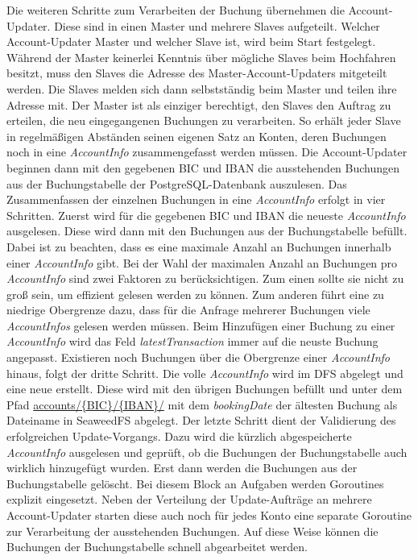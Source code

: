 \documentclass[12pt,oneside,a4paper,parskip]{scrbook}
\begin{document}
Die weiteren Schritte zum Verarbeiten der Buchung übernehmen die Account-Updater. Diese sind in einen Master und mehrere Slaves aufgeteilt. Welcher Account-Updater Master und welcher Slave ist, wird beim Start festgelegt. Während der Master keinerlei Kenntnis über mögliche Slaves beim Hochfahren besitzt, muss den Slaves die  Adresse des Master-Account-Updaters mitgeteilt werden. Die Slaves melden sich dann selbstständig beim Master und teilen ihre Adresse mit. Der Master ist als einziger berechtigt, den Slaves den Auftrag zu erteilen, die neu eingegangenen Buchungen zu verarbeiten. So  erhält jeder Slave in regelmäßigen Abständen seinen eigenen Satz an Konten, deren Buchungen noch in eine \textit{AccountInfo} zusammengefasst werden müssen. Die Account-Updater beginnen dann mit den gegebenen BIC und IBAN die ausstehenden Buchungen aus der Buchungstabelle der PostgreSQL-Datenbank auszulesen. Das Zusammenfassen der einzelnen Buchungen in eine \textit{AccountInfo} erfolgt in vier Schritten. Zuerst wird für die gegebenen BIC und IBAN die neueste \textit{AccountInfo} ausgelesen. Diese wird dann mit den Buchungen aus der Buchungstabelle befüllt. Dabei ist zu beachten, dass es eine maximale Anzahl an Buchungen innerhalb einer \textit{AccountInfo} gibt. Bei der Wahl der maximalen Anzahl an Buchungen pro \textit{AccountInfo} sind zwei Faktoren zu berücksichtigen. Zum einen sollte sie nicht zu groß sein, um effizient gelesen werden zu können. Zum anderen führt eine zu niedrige Obergrenze dazu, dass für die Anfrage mehrerer Buchungen viele \textit{AccountInfos} gelesen werden müssen. Beim Hinzufügen einer Buchung zu einer \textit{AccountInfo} wird das Feld \textit{latestTransaction} immer auf die neuste Buchung angepasst. Existieren noch Buchungen über die Obergrenze einer \textit{AccountInfo} hinaus, folgt der dritte Schritt. Die volle \textit{AccountInfo} wird im DFS abgelegt und eine neue erstellt. Diese wird mit den übrigen Buchungen befüllt und unter dem Pfad \url{accounts/{BIC}/{IBAN}/} mit dem \textit{bookingDate} der ältesten Buchung als Dateiname in SeaweedFS abgelegt. Der letzte Schritt dient der Validierung des erfolgreichen Update-Vorgangs. Dazu wird die kürzlich abgespeicherte \textit{AccountInfo} ausgelesen und geprüft, ob die Buchungen der Buchungstabelle auch wirklich hinzugefügt wurden. Erst dann werden die Buchungen aus der Buchungstabelle gelöscht. Bei diesem Block an Aufgaben werden Goroutines explizit eingesetzt. Neben der Verteilung der Update-Aufträge an mehrere Account-Updater starten diese auch noch für jedes Konto eine separate Goroutine zur Verarbeitung der ausstehenden Buchungen. Auf diese Weise können die Buchungen der Buchungstabelle schnell abgearbeitet werden.
\end{document}
